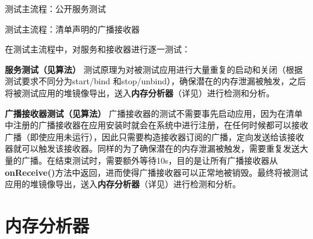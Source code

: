 \begin{algorithm}
	\caption{测试主流程：公开服务测试}
	\label{alg:service}
	\begin{algorithmic}[1]
			\ENDIF
				\ELSE
				\ENDIF
			\ENDWHILE
			\ENDIF
		\ENDFOR
	\end{algorithmic}
\end{algorithm}

\begin{algorithm}
	\caption{测试主流程：清单声明的广播接收器}
	\label{alg:receiver}
	\begin{algorithmic}[1]
			\ENDWHILE
		\ENDFOR
	\end{algorithmic}
\end{algorithm}

在测试主流程中，对服务和接收器进行逐一测试：

\textbf{服务测试（见算法\redbf{\ref{alg:service}}） }  测试原理为对被测试应用进行大量重复的启动和关闭（根据测试要求不同分为start/bind 和stop/unbind），确保潜在的内存泄漏被触发，之后将被测试应用的堆镜像导出，送入\textbf{内存分析器}（详见\redbf{\ref{memory analyser}}）进行检测和分析。

\textbf{广播接收器测试（见算法\redbf{\ref{alg:receiver}}） }
广播接收器的测试不需要事先启动应用，因为在清单中注册的广播接收器在应用安装时就会在系统中进行注册，在任何时候都可以接收广播（即使应用未运行），因此只需要构造接收器订阅的广播，定向发送给该接收器就可以触发该接收器。同样的为了确保潜在的内存泄漏被触发，需要重复发送大量的广播。在结束测试时，需要额外等待10s，目的是让所有广播接收器从\textbf{onReceive()}方法中返回，进而使得广播接收器可以正常地被销毁。最终将被测试应用的堆镜像导出，送入\textbf{内存分析器}（详见\redbf{\ref{memory analyser}}）进行检测和分析。
\section{内存分析器}\label{memory analyser}

